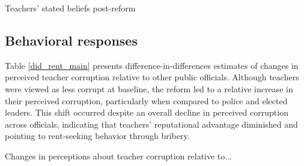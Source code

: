 \documentclass[hidelinks,12pt]{article}
\begin{document}
\begin{singlespace}
\begingroup
\setlength{\tabcolsep}{14pt}  %
\begin{table}[H]
   \begin{singlespace}
    \centering
    \fontsize{11pt}{10pt}\selectfont  %
    \caption{Teachers' stated beliefs post-reform} \label{did_beliefs_main}
    \end{singlespace}
\end{table}
\endgroup

\subsection{Behavioral responses}
Table \ref{did_rent_main} presents difference-in-differences estimates of changes in perceived teacher corruption relative to other public officials. Although teachers were viewed as less corrupt at baseline, the reform led to a relative increase in their perceived corruption, particularly when compared to police and elected leaders. This shift occurred despite an overall decline in perceived corruption across officials, indicating that teachers’ reputational advantage diminished and pointing to rent-seeking behavior through bribery.

\begingroup
\setlength{\tabcolsep}{18pt}  %
\begin{table}[H]
   \begin{singlespace}
    \centering
    \fontsize{11pt}{10pt}\selectfont  %
    \caption{Changes in perceptions about teacher corruption relative to...} \label{did_rent_main}
    \end{singlespace}
\end{table}
\endgroup


\end{singlespace}
\end{document}
